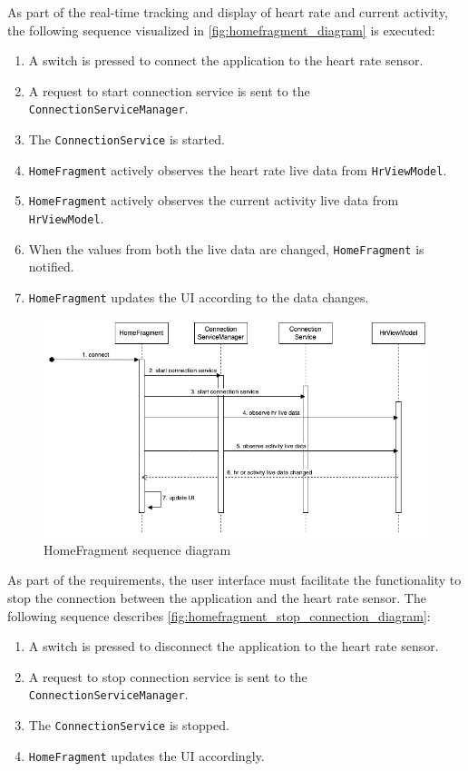 As part of the real-time tracking and display of heart rate and current activity, the following sequence visualized in \autoref{fig:homefragment_diagram} is executed:
\begin{enumerate}
    \item A switch is pressed to connect the application to the heart rate sensor.
    \item A request to start connection service is sent to the \texttt{ConnectionServiceManager}.
    \item The \texttt{ConnectionService} is started.
    \item \texttt{HomeFragment} actively observes the heart rate live data from \texttt{HrViewModel}.
    \item \texttt{HomeFragment} actively observes the current activity live data from \texttt{HrViewModel}.
    \item When the values from both the live data are changed, \texttt{HomeFragment} is notified.
    \item \texttt{HomeFragment} updates the UI according to the data changes.

\end{enumerate}

\begin{figure}[H]
    \centering
    \includegraphics[width=1\textwidth]{diagrams/hr-broadcast-homefragment.drawio.png}
    \caption{HomeFragment sequence diagram}
    \label{fig:homefragment_diagram}
\end{figure}

As part of the requirements, the user interface must facilitate the functionality to stop the connection between the application and the heart rate sensor. 
The following sequence describes \autoref{fig:homefragment_stop_connection_diagram}:
\begin{enumerate}
    \item A switch is pressed to disconnect the application to the heart rate sensor.
    \item A request to stop connection service is sent to the \texttt{ConnectionServiceManager}.
    \item The \texttt{ConnectionService} is stopped.
    \item \texttt{HomeFragment} updates the UI accordingly.
\end{enumerate}

